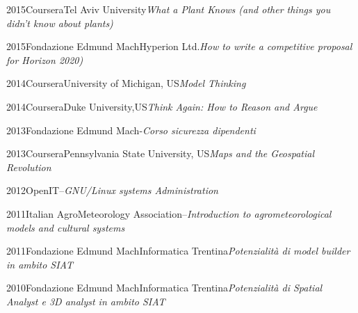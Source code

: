 \documentclass{curriculum}
\begin{document}
    \begin{entrylist}
    \entry
        {2015}{Coursera}{Tel Aviv University}{\emph{What a Plant Knows (and other things you didn’t know about plants)}}
    \end{entrylist}

    \begin{entrylist}
    \entry
        {2015}{Fondazione Edmund Mach}{Hyperion Ltd.}{\emph{How to write a competitive proposal for Horizon 2020)}}
    \end{entrylist}
    
    \begin{entrylist}
    \entry
        {2014}{Coursera}{University of Michigan, US}{\emph{Model Thinking}}
    \end{entrylist}
    \begin{entrylist}
    \entry
        {2014}{Coursera}{Duke University,US}{\emph{Think Again: How to Reason and Argue}}
    \end{entrylist}
    
    \begin{entrylist}
    \entry
        {2013}{Fondazione Edmund Mach}{-}{\emph{Corso sicurezza dipendenti}}
    \end{entrylist}
    
    \begin{entrylist}
    \entry
        {2013}{Coursera}{Pennsylvania State University, US}{\emph{Maps and the Geospatial Revolution}}
    \end{entrylist}
    
    \begin{entrylist}
    \entry
        {2012}{OpenIT}{--}{\emph{GNU/Linux systems Administration}}
    \end{entrylist}
    
    \begin{entrylist}
    \entry
        {2011}{Italian AgroMeteorology Association}{--}{\emph{Introduction to agrometeorological models and cultural systems}}
    \end{entrylist}
    
    \begin{entrylist}
    \entry
        {2011}{Fondazione Edmund Mach}{Informatica Trentina}{\emph{Potenzialità di model builder in ambito SIAT}}
    \end{entrylist}   
    
    \begin{entrylist}
    \entry
        {2010}{Fondazione Edmund Mach}{Informatica Trentina}{\emph{Potenzialità di Spatial Analyst e 3D analyst in ambito SIAT}}
    \end{entrylist} 
    
\end{document}
